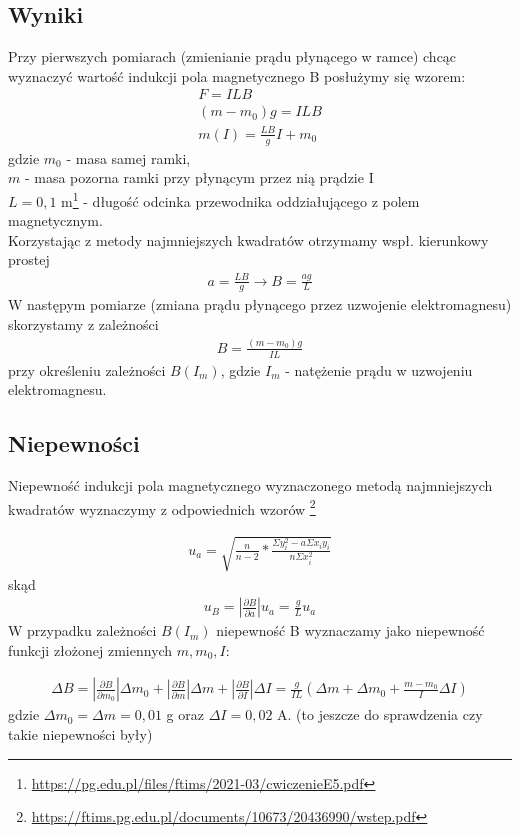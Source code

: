 \documentclass{article}
\begin{document}
\subsection{Wyniki}
Przy pierwszych pomiarach (zmienianie prądu płynącego w ramce) chcąc wyznaczyć 
wartość indukcji pola magnetycznego B posłużymy się wzorem:
\begin{gather*}
	F = ILB \\
	(m-m_0)g = ILB \\
	m(I) = \frac{LB}{g}I + m_0
\end{gather*} 
gdzie $m_0$ - masa samej ramki,\\
$m$ - masa pozorna ramki przy płynącym przez nią prądzie I \\
$L=0,1$ m\footnote{\url{https://pg.edu.pl/files/ftims/2021-03/cwiczenieE5.pdf}} - długość odcinka przewodnika oddziałującego z polem magnetycznym. \\
Korzystając z metody najmniejszych kwadratów otrzymamy wspł.  kierunkowy prostej
\begin{gather*}
	a = \frac{LB}{g} \rightarrow B = \frac{ag}{L}
\end{gather*}
W następym pomiarze (zmiana prądu płynącego przez uzwojenie elektromagnesu) skorzystamy z zależności
\begin{gather*}
	B = \frac{(m-m_0)g}{IL}
\end{gather*}
przy określeniu zależności $B(I_m)$, gdzie $I_m$ - natężenie prądu w uzwojeniu elektromagnesu.

\subsection{Niepewności}
Niepewność indukcji pola magnetycznego wyznaczonego metodą najmniejszych kwadratów wyznaczymy z odpowiednich wzorów  \footnote{\url{https://ftims.pg.edu.pl/documents/10673/20436990/wstep.pdf}}\:

\begin{gather*}
		u_a = \sqrt{\frac{n}{n-2} * \frac{\Sigma y_i^2 - a\Sigma x_iy_i}{n\Sigma x_i^2}} 
\end{gather*}
skąd
\begin{gather*}
		u_B= |\frac{\partial B}{\partial a}| u_a = \frac{g}{L}u_a
\end{gather*}
W przypadku zależności $B(I_m)$ niepewność B wyznaczamy jako niepewność funkcji złożonej zmiennych 
$m, m_0, I$:

\begin{gather*}
		\Delta B = |\frac{\partial B}{\partial m_0}|\Delta m_0 + |\frac{\partial B}{\partial m}|\Delta m + |\frac{\partial B}{\partial I}|\Delta I = \frac{g}{IL}(\Delta m + \Delta m_0 + \frac{m-m_0}{I}\Delta I)
\end{gather*}
gdzie $\Delta m_0 =\Delta m = 0,01$ g oraz $\Delta I = 0,02$ A. (to jeszcze do sprawdzenia czy takie niepewności były)
\end{document}
